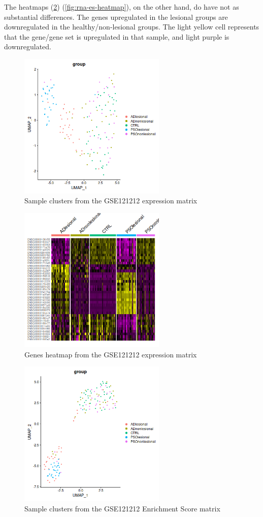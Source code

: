 \documentclass[aps,prb,twocolumn,superscriptaddress,floatfix,longbibliography]{revtex4-2}
\begin{document}
The heatmaps (\ref{fig:rna-expr-heatmap}) (\ref{fig:rna-es-heatmap}), on the other hand, do have not as substantial differences. The genes upregulated in the lesional groups are downregulated in the healthy/non-lesional groups. The light yellow cell represents that the gene/gene set is upregulated in that sample, and light purple is downregulated.

\begin{figure}[h]
\centering
\includegraphics[clip=true,width=7cm]{img/GSE121212-expr-clusters.png}
\caption{Sample clusters from the GSE121212 expression matrix}
\label{fig:rna-expr-clusters}
\end{figure}

\begin{figure}[h]
\centering
\includegraphics[clip=true,width=7cm]{img/GSE121212-expr-heatmap.png}
\caption{Genes heatmap from the GSE121212 expression matrix}
\label{fig:rna-expr-heatmap}
\end{figure}

\begin{figure}[h]
\centering
\includegraphics[clip=true,width=7cm]{img/GSE121212-ES-clusters.png}
\caption{Sample clusters from the GSE121212 Enrichment Score matrix}
\label{fig:rna-es-clusters}
\end{figure}
\end{document}

